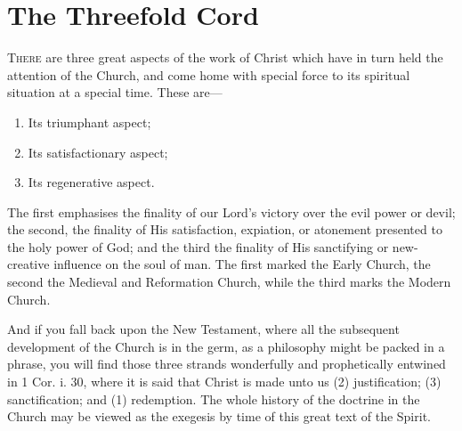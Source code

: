 \documentclass[draft]{ptfdoc}
\begin{document}
\chapter{The Threefold Cord}


\textsc{There} are three great aspects of the work 
of Christ which have in turn held the 
attention of the Church, and come home with 
special force to its spiritual situation at a special 
time. These are--- 

\begin{enumerate}
\item Its triumphant aspect; 
\item Its satisfactionary aspect; 
\item Its regenerative aspect. 
\end{enumerate}

The first emphasises the finality of our Lord's 
victory over the evil power or devil; the second, 
the finality of His satisfaction, expiation, or 
atonement presented to the holy power of God; 
and the third the finality of His sanctifying or 
new-creative influence on the soul of man. The 
first marked the Early Church, the second the 
Medieval and Reformation Church, while the 
third marks the Modern Church. 

And if you fall back upon the New Testament, 
where all the subsequent development of the 
Church is in the germ, as a philosophy might be 
packed in a phrase, you will find those three 
strands wonderfully and prophetically entwined 
in 1 Cor. i. 30, where it is said that Christ is 
made unto us (2) justification; (3) sanctification; 
and (1) redemption. The whole history of the 
doctrine in the Church may be viewed as the 
exegesis by time of this great text of the Spirit. 
\end{document}
